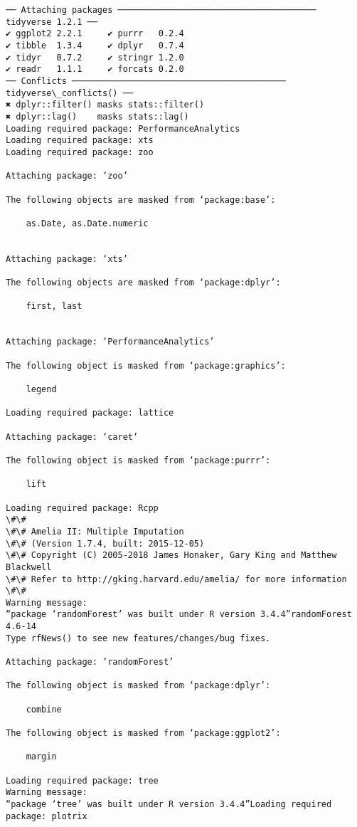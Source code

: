 \documentclass[11pt]{article}
\begin{document}
    \begin{Verbatim}[commandchars=\\\{\}]
── Attaching packages ─────────────────────────────────────── tidyverse 1.2.1 ──
✔ ggplot2 2.2.1     ✔ purrr   0.2.4
✔ tibble  1.3.4     ✔ dplyr   0.7.4
✔ tidyr   0.7.2     ✔ stringr 1.2.0
✔ readr   1.1.1     ✔ forcats 0.2.0
── Conflicts ────────────────────────────────────────── tidyverse\_conflicts() ──
✖ dplyr::filter() masks stats::filter()
✖ dplyr::lag()    masks stats::lag()
Loading required package: PerformanceAnalytics
Loading required package: xts
Loading required package: zoo

Attaching package: ‘zoo’

The following objects are masked from ‘package:base’:

    as.Date, as.Date.numeric


Attaching package: ‘xts’

The following objects are masked from ‘package:dplyr’:

    first, last


Attaching package: ‘PerformanceAnalytics’

The following object is masked from ‘package:graphics’:

    legend

Loading required package: lattice

Attaching package: ‘caret’

The following object is masked from ‘package:purrr’:

    lift

Loading required package: Rcpp
\#\# 
\#\# Amelia II: Multiple Imputation
\#\# (Version 1.7.4, built: 2015-12-05)
\#\# Copyright (C) 2005-2018 James Honaker, Gary King and Matthew Blackwell
\#\# Refer to http://gking.harvard.edu/amelia/ for more information
\#\# 
Warning message:
“package ‘randomForest’ was built under R version 3.4.4”randomForest 4.6-14
Type rfNews() to see new features/changes/bug fixes.

Attaching package: ‘randomForest’

The following object is masked from ‘package:dplyr’:

    combine

The following object is masked from ‘package:ggplot2’:

    margin

Loading required package: tree
Warning message:
“package ‘tree’ was built under R version 3.4.4”Loading required package: plotrix


\end{Verbatim}
\end{document}
